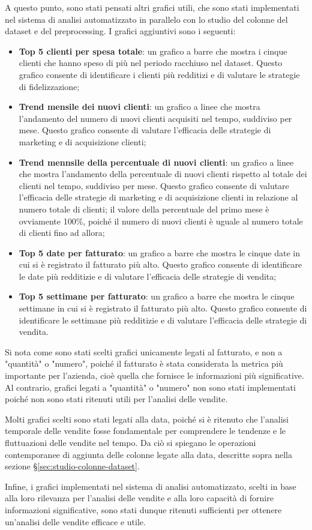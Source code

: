 A questo punto, sono stati pensati altri grafici utili, che sono stati implementati nel sistema di analisi automatizzato in parallelo con lo studio del colonne del dataset e del \gls{preprocessing}. I grafici aggiuntivi sono i seguenti:
\begin{itemize}
    \item \textbf{Top 5 clienti per spesa totale}: un grafico a barre che mostra i cinque clienti che hanno speso di più nel periodo racchiuso nel dataset. Questo grafico consente di identificare i clienti più redditizi e di valutare le strategie di fidelizzazione;
    \item \textbf{Trend mensile dei nuovi clienti}: un grafico a linee che mostra l'andamento del numero di nuovi clienti acquisiti nel tempo, suddiviso per mese. Questo grafico consente di valutare l'efficacia delle strategie di marketing e di acquisizione clienti;
    \item \textbf{Trend mennsile della percentuale di nuovi clienti}: un grafico a linee che mostra l'andamento della percentuale di nuovi clienti rispetto al totale dei clienti nel tempo, suddiviso per mese. Questo grafico consente di valutare l'efficacia delle strategie di marketing e di acquisizione clienti in relazione al numero totale di clienti; il valore della percentuale del primo mese è ovviamente 100\%, poiché il numero di nuovi clienti è uguale al numero totale di clienti fino ad allora;
    \item \textbf{Top 5 date per fatturato}: un grafico a barre che mostra le cinque date in cui si è registrato il fatturato più alto. Questo grafico consente di identificare le date più redditizie e di valutare l'efficacia delle strategie di vendita;
    \item \textbf{Top 5 settimane per fatturato}: un grafico a barre che mostra le cinque settimane in cui si è registrato il fatturato più alto. Questo grafico consente di identificare le settimane più redditizie e di valutare l'efficacia delle strategie di vendita.
\end{itemize}

Si nota come sono stati scelti grafici unicamente legati al fatturato, e non a "quantità" o "numero", poiché il fatturato è stata considerata la metrica più importante per l'azienda, cioè quella che fornisce le informazioni più significative. Al contrario, grafici legati a "quantità" o "numero" non sono stati implementati poiché non sono stati ritenuti utili per l'analisi delle vendite.

Molti grafici scelti sono stati legati alla data, poiché si è ritenuto che l'analisi temporale delle vendite fosse fondamentale per comprendere le tendenze e le fluttuazioni delle vendite nel tempo. Da ciò si spiegano le operazioni contemporanee di aggiunta delle colonne legate alla data, descritte sopra nella sezione \S\ref{sec:studio-colonne-dataset}.

Infine, i grafici implementati nel sistema di analisi automatizzato, scelti in base alla loro rilevanza per l'analisi delle vendite e alla loro capacità di fornire informazioni significative, sono stati dunque ritenuti sufficienti per ottenere un'analisi delle vendite efficace e utile.

